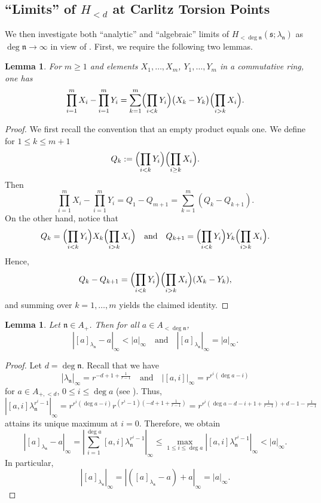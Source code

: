 \documentclass[12pt,reqno]{amsart}
\numberwithin{equation}{section}
\theoremstyle{plain}
\newtheorem{lem}[thm]{Lemma}
\theoremstyle{definition}
\theoremstyle{remark}
\newcommand{\nfk}{\mathfrak{n}}
\newcommand{\ww}[1]{\mathfrak{#1}}
\begin{document}
\subsection{``Limits'' of \texorpdfstring{$H_{<d}$}{H<d} at Carlitz Torsion Points}\label{section:3.4}
We then investigate both ``analytic'' and ``algebraic'' limits of $H_{<\deg \nfk}(\ww{s};\lambda_\nfk)$ as $\deg\nfk\to\infty$ in view of \cite{BTT18}. First, we require the following two lemmas.

\begin{lem}\label{lem:prod-identity}
For $m\ge1$ and elements $X_1,\dots,X_m$, $Y_1,\dots,Y_m$ in a commutative ring, one has
\[
\prod_{i=1}^m X_i-\prod_{i=1}^m Y_i
=\sum_{k=1}^m
\Bigl(\prod_{i<k}Y_i\Bigr)
\bigl(X_k-Y_k\bigr)
\Bigl(\prod_{i>k}X_i\Bigr).
\]
\end{lem}

\begin{proof}
We first recall the convention that an empty product equals one. We define for $1\le k\le m+1$
\[
Q_k:=\Bigl(\prod_{i<k}Y_i\Bigr)\Bigl(\prod_{i\ge k}X_i\Bigr).
\]
Then
\[
\prod_{i=1}^m X_i-\prod_{i=1}^m Y_i = Q_1-Q_{m+1} = \sum_{k=1}^m (Q_k-Q_{k+1}).
\]
On the other hand, notice that
\[
Q_k = \Bigl(\prod_{i<k}Y_i\Bigr)X_k\Bigl(\prod_{i>k}X_i\Bigr)\quad\text{and}\quad
Q_{k+1} = \Bigl(\prod_{i<k}Y_i\Bigr)Y_k\Bigl(\prod_{i>k}X_i\Bigr).
\]
Hence,
\[
Q_k-Q_{k+1}
= \Bigl(\prod_{i<k}Y_i\Bigr)\Bigl(\prod_{i>k}X_i\Bigr)(X_k-Y_k),
\]
and summing over $k=1,\dots,m$ yields the claimed identity.
\end{proof}

\begin{lem}\label{lem:[a]n=a}Let $\nfk\in A_+$. Then for all $a\in A_{<{\deg\nfk}}$,$$|[a]_{\lambda_{\nfk}}-a|_\infty<|a|_\infty \quad\text{and}\quad|[a]_{\lambda_\nfk}|_\infty=|a|_\infty.$$\end{lem}\begin{proof}Let $d=\deg\nfk$. Recall that we have $$|\lambda_\nfk|_\infty=r^{-d+1+\frac{1}{r-1}}\quad\text{and}\quad\left|[a,i]\right|_\infty=r^{r^i(\deg a-i)}$$for $a\in A_{+,<d}$, $0\leq i\leq \deg a$ (see \cite[Propositions 12.11 and 12.13]{Rosen2002}). Thus,$$\left|[a,i]\lambda_\nfk^{r^i-1}\right|_\infty=r^{r^i(\deg a-i)}r^{(r^i-1)(-d+1+\frac{1}{r-1})}=r^{r^i(\deg a-d-i+1+\frac{1}{r-1})+d-1-\frac{1}{r-1}}$$attains its unique maximum at $i=0$. Therefore, we obtain$$|[a]_{\lambda_{\nfk}}-a|_\infty=\left|\sum_{i=1}^{\deg a}[a,i]\lambda_\nfk^{r^i-1}\right|_\infty\leq \max_{1\leq i\leq \deg a}\left|[a,i]\lambda_\nfk^{r^i-1}\right|_\infty<|a|_\infty.$$
In particular,
\[
\left|[a]_{\lambda_\nfk}\right|_\infty=\left|([a]_{\lambda_\nfk}-a)+a\right|_\infty=|a|_\infty.
\]
\end{proof}
\end{document}
